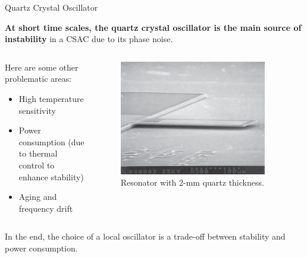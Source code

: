 \begin{frame}{Quartz Crystal Oscillator}

    \textbf{At short time scales, the quartz crystal oscillator is the main source of instability} in a CSAC due to its phase noise.

    \begin{columns}[c, onlytextwidth]

        \begin{column}{0.6\textwidth}

            Here are some other problematic areas:

            \begin{itemize}
                \item High temperature sensitivity
                \item Power consumption (due to thermal control to enhance stability)
                \item Aging and frequency drift
            \end{itemize}

        \end{column}

        \begin{column}{0.4\textwidth}

            \begin{figure}
                \centering
                \includegraphics[width=0.9\textwidth]{img/thin-local-oscillator.png}
                \caption{Resonator with 2-mm quartz thickness\footnotemark[1].}
            \end{figure}

        \end{column}

    \end{columns}

    In the end, the choice of a local oscillator is a trade-off between stability and power consumption.


\end{frame}